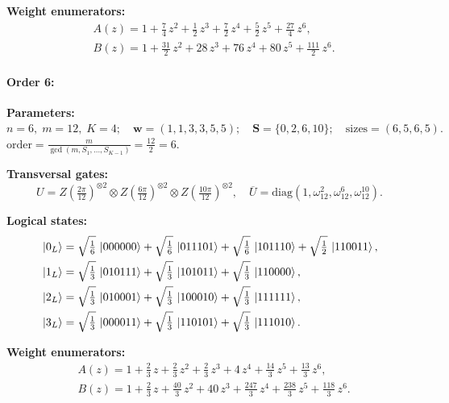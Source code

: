 \documentclass[pdflatex,sn-nature]{sn-jnl}%
\theoremstyle{thmstyleone}%
\theoremstyle{thmstyletwo}%
\theoremstyle{thmstylethree}%
\begin{document}
\begin{appendices}
\noindent\textbf{Weight enumerators:}
\begin{align*}
    &A(z) = 1 + \tfrac{7}{4}\,z^{2} + \tfrac{1}{2}\,z^{3} + \tfrac{7}{2}\,z^{4} + \tfrac{5}{2}\,z^{5} + \tfrac{27}{4}\,z^{6}, \\
    &B(z) = 1 + \tfrac{31}{2}\,z^{2} + 28\,z^{3} + 76\,z^{4} + 80\,z^{5} + \tfrac{111}{2}\,z^{6}.
\end{align*}

\paragraph{\textbf{Order 6:}} 

\noindent\textbf{Parameters:} $n=6,\; m=12,\; K=4;\quad \mathbf w=(1, 1, 3, 3, 5, 5);\quad \mathbf S=\{0, 2, 6, 10\};\quad \text{sizes}=\left(6, 5, 6, 5\right).$ $\displaystyle \text{order}=\frac{m}{\gcd(m,S_1,\dots,S_{K-1})}=\frac{12}{2}=6.$

\noindent\textbf{Transversal gates:}
\[
    U=Z \left(\tfrac{2\pi}{12}\right)^{\otimes2} \otimes Z \left(\tfrac{6\pi}{12}\right)^{\otimes2} \otimes Z \left(\tfrac{10\pi}{12}\right)^{\otimes2},\quad
    \overline U=\mathrm{diag}(1,\omega_{12}^{2},\omega_{12}^{6},\omega_{12}^{10}).
\]

\noindent\textbf{Logical states:}
\begin{align*}
    &\ket{0_L} = \sqrt{\tfrac{1}{6}}\,\ket{000000} + \sqrt{\tfrac{1}{6}}\,\ket{011101} + \sqrt{\tfrac{1}{6}}\,\ket{101110} + \sqrt{\tfrac{1}{2}}\,\ket{110011}, \\
    &\ket{1_L} = \sqrt{\tfrac{1}{3}}\,\ket{010111} + \sqrt{\tfrac{1}{3}}\,\ket{101011} + \sqrt{\tfrac{1}{3}}\,\ket{110000}, \\
    &\ket{2_L} = \sqrt{\tfrac{1}{3}}\,\ket{010001} + \sqrt{\tfrac{1}{3}}\,\ket{100010} + \sqrt{\tfrac{1}{3}}\,\ket{111111}, \\
    &\ket{3_L} = \sqrt{\tfrac{1}{3}}\,\ket{000011} + \sqrt{\tfrac{1}{3}}\,\ket{110101} + \sqrt{\tfrac{1}{3}}\,\ket{111010}.
\end{align*}

\noindent\textbf{Weight enumerators:}
\begin{align*}
    &A(z) = 1 + \tfrac{2}{3}\,z + \tfrac{2}{3}\,z^{2} + \tfrac{2}{3}\,z^{3} + 4\,z^{4} + \tfrac{14}{3}\,z^{5} + \tfrac{13}{3}\,z^{6}, \\
    &B(z) = 1 + \tfrac{2}{3}\,z + \tfrac{40}{3}\,z^{2} + 40\,z^{3} + \tfrac{247}{3}\,z^{4} + \tfrac{238}{3}\,z^{5} + \tfrac{118}{3}\,z^{6}.
\end{align*}


\end{appendices}
\end{document}
